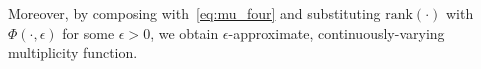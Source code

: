 \documentclass[12pt]{article}
\numberwithin{equation}{section}
\newcommand{\+}{%
	\raisebox{0.18ex}{\scaleobj{0.55}{+}}
}
\newtheorem{definition}{Definition}
\theoremstyle{definition}
\begin{document}
Moreover, by composing with~\eqref{eq:mu_four} and substituting $\mathrm{rank}(\cdot)$ with $\Phi(\cdot, \epsilon)$ for some $\epsilon > 0$, we obtain $\epsilon$-approximate, continuously-varying multiplicity function. 
\end{document}
